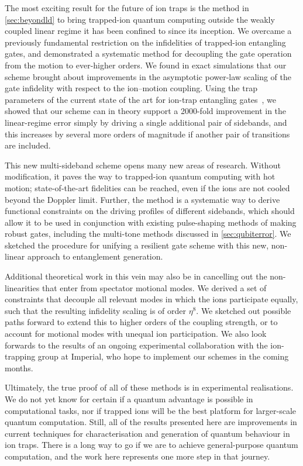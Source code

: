 The most exciting result for the future of ion traps is the method in \cref{sec:beyondld} to bring trapped-ion quantum computing outside the weakly coupled linear regime it has been confined to since its inception.
We overcame a previously fundamental restriction on the infidelities of trapped-ion entangling gates, and demonstrated a systematic method for decoupling the gate operation from the motion to ever-higher orders.
We found in exact simulations that our scheme brought about improvements in the asymptotic power-law scaling of the gate infidelity with respect to the ion--motion coupling.
Using the trap parameters of the current state of the art for ion-trap entangling gates~\cite{Schaefer2018}, we showed that our scheme can in theory support a \num{2000}-fold improvement in the linear-regime error simply by driving a single additional pair of sidebands, and this increases by several more orders of magnitude if another pair of transitions are included.

This new multi-sideband scheme opens many new areas of research.
Without modification, it paves the way to trapped-ion quantum computing with hot motion; state-of-the-art fidelities can be reached, even if the ions are not cooled beyond the Doppler limit.
Further, the method is a systematic way to derive functional constraints on the driving profiles of different sidebands, which should allow it to be used in conjunction with existing pulse-shaping methods of making robust gates, including the multi-tone methods discussed in \cref{sec:qubiterror}.
We sketched the procedure for unifying a resilient gate scheme with this new, non-linear approach to entanglement generation.

Additional theoretical work in this vein may also be in cancelling out the non-linearities that enter from spectator motional modes.
We derived a set of constraints that decouple all relevant modes in which the ions participate equally, such that the resulting infidelity scaling is of order $\eta^8$.
We sketched out possible paths forward to extend this to higher orders of the coupling strength, or to account for motional modes with unequal ion participation.
We also look forwards to the results of an ongoing experimental collaboration with the ion-trapping group at Imperial, who hope to implement our schemes in the coming months.

Ultimately, the true proof of all of these methods is in experimental realisations.
We do not yet know for certain if a quantum advantage is possible in computational tasks, nor if trapped ions will be the best platform for larger-scale quantum computation.
Still, all of the results presented here are improvements in current techniques for characterisation and generation of quantum behaviour in ion traps.
There is a long way to go if we are to achieve general-purpose quantum computation, and the work here represents one more step in that journey.
